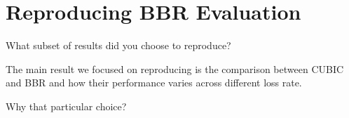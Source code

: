 
\section{Reproducing BBR Evaluation}

 What subset of results did you choose to reproduce?

The main result we focused on reproducing is the comparison between
CUBIC and BBR and how their performance varies across different loss
rate.

 Why that particular choice?
